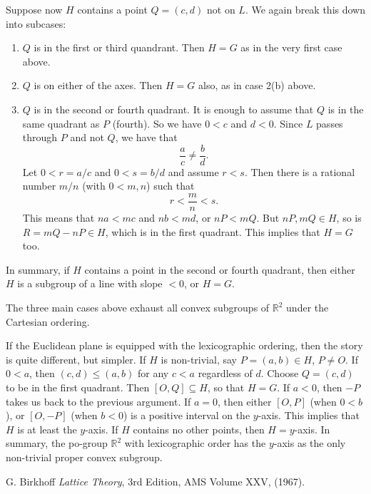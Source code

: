 \documentclass[12pt]{article}
\begin{document}
\begin{enumerate}
Suppose now $H$ contains a point $Q=(c,d)$ not on $L$.  We again break this down into subcases:
\begin{enumerate}
\item $Q$ is in the first or third quandrant.  Then $H=G$ as in the very first case above.
\item $Q$ is on either of the axes.  Then $H=G$ also, as in case 2(b) above.
\item $Q$ is in the second or fourth quadrant.  It is enough to assume that $Q$ is in the same quadrant as $P$ (fourth).  So we have $0<c$ and $d<0$.  Since $L$ passes through $P$ and not $Q$, we have that $$\frac{a}{c}\ne \frac{b}{d}.$$  Let $0<r=a/c$ and $0<s=b/d$ and assume $r<s$.  Then there is a rational number $m/n$ (with $0<m,n$) such that $$r<\frac{m}{n}<s.$$  This means that $na< mc$ and $nb<md$, or $nP<mQ$.  But $nP,mQ\in H$, so is $R=mQ-nP\in H$, which is in the first quadrant.  This implies that $H=G$ too.
\end{enumerate}
In summary, if $H$ contains a point in the second or fourth quadrant, then either $H$ is a subgroup of a line with slope $<0$, or $H=G$.
\end{enumerate}
The three main cases above exhaust all convex subgroups of $\mathbb{R}^2$ under the Cartesian ordering.  

If the Euclidean plane is equipped with the lexicographic ordering, then the story is quite different, but simpler.  If $H$ is non-trivial, say $P=(a,b)\in H$, $P\ne O$.  If $0<a$, then $(c,d)\le (a,b)$ for any $c< a$ regardless of $d$.  Choose $Q=(c,d)$ to be in the first quadrant.  Then $[O,Q]\subseteq H$, so that $H=G$.  If $a<0$, then $-P$ takes us back to the previous argument.  If $a=0$, then either $[O,P]$ (when $0<b$), or $[O,-P]$ (when $b<0$) is a positive interval on the $y$-axis.  This implies that $H$ is at least the $y$-axis.  If $H$ contains no other points, then $H=y$-axis.  In summary, the po-group $\mathbb{R}^2$ with lexicographic order has the $y$-axis as the only non-trivial proper convex subgroup.


\begin{thebibliography}{8}
 G. Birkhoff {\em Lattice Theory}, 3rd Edition, AMS Volume XXV, (1967).
\end{thebibliography}
\end{document}
